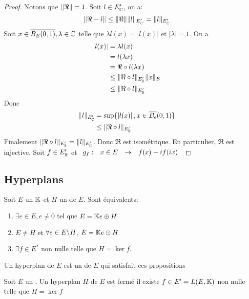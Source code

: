 \documentclass[]{report}
\begin{document}
    \begin{proof}
        Notons que $\lVert \Re \rVert=1$. Soit $l\in E_{\mathbb{C}}'$, on a:
        \[\lVert \Re-l \rVert\le \lVert \Re \rVert\lVert l \rVert_{E_C'}=\lVert l \rVert_{E_{\mathbb{C}}'}\]
        Soit $x\in \overline{B_E(0,1)}, \lambda\in \mathbb{C}$ telle que $\lambda l(x)=|l(x)|$ et $|\lambda|=1$. On a
        \begin{align*}
            \left|l(x)\right|&=\lambda l(x)\\
            &= l(\lambda x)\\
            &=\Re\circ l(\lambda x)\\
            &\le \lVert \Re\circ l \rVert_{E'_{\mathbb{R}}}\lVert x \rVert_E\\
            &\le \lVert \Re\circ l \rVert_{E'_{\mathbb{R}}}
        \end{align*}
        Donc
        \begin{align*}
            \lVert l \rVert_{E'_{\mathbb{C}}}&=\sup\{\left| l(x)\right|,x\in \overline{B_\epsilon}(0,1)\}\\
            &\le \lVert \Re\circ l \rVert_{E'_{\mathbb{R}}}
        \end{align*}
        Finalement $\lVert \Re\circ l \rVert_{E'_{\mathbb{R}}}=\lVert l \rVert_{E'_{\mathbb{C}}}$. Donc $\Re$ est isométrique. En particulier, $\Re$ est injective. Soit $f \in E'_{\mathbb{R}}$ et $\begin{array}{ccccc} g_f : & x\in E & \to & f(x)-i f(ix) \end{array}$
    \end{proof}

    \subsection*{Hyperplans}

    \begin{prop}{}{}
        Soit $E$ un $\mathbb{K}$-\ev et $H$ un \sev de $E$. Sont équivalents:
        \begin{enumerate}
            \item $\exists e\in E,e\neq 0$ tel que $E=\mathbb{K} e\oplus H$
            \item $E\neq H$ et $\forall e\in E\backslash H$, $E=\mathbb{K} e\oplus H$
            \item $\exists f\in E^*$ non nulle telle que $H=\ker f$.
        \end{enumerate}
        Un hyperplan de $E$ est un \sev de $E$ qui satisfait ces propositions
    \end{prop}

    \begin{prop}{}{}
        Soit $E$ un \evn. Un hyperplan $H$ de $E$ est fermé \ssi il existe $f\in E'=L(E,\mathbb{K})$ non nulle telle que $H=\ker f$ 
    \end{prop}
\end{document}
